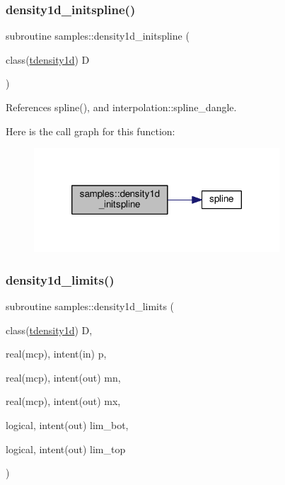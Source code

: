 \mbox{\label{namespacesamples_a87a98c09efa7d17b3ff7d0db04d66b73}} 
\subsubsection{\texorpdfstring{density1d\+\_\+initspline()}{density1d\_initspline()}}
{\footnotesize\ttfamily subroutine samples\+::density1d\+\_\+initspline (\begin{DoxyParamCaption}\item[{class(\mbox{\hyperlink{structsamples_1_1tdensity1d}{tdensity1d}})}]{D }\end{DoxyParamCaption})}



References spline(), and interpolation\+::spline\+\_\+dangle.

Here is the call graph for this function\+:
\nopagebreak
\begin{figure}[H]
\begin{center}
\leavevmode
\includegraphics[width=260pt]{namespacesamples_a87a98c09efa7d17b3ff7d0db04d66b73_cgraph}
\end{center}
\end{figure}
\mbox{\label{namespacesamples_a65a3ed5d18fe56c9dbc21e5787d86047}} 
\subsubsection{\texorpdfstring{density1d\+\_\+limits()}{density1d\_limits()}}
{\footnotesize\ttfamily subroutine samples\+::density1d\+\_\+limits (\begin{DoxyParamCaption}\item[{class(\mbox{\hyperlink{structsamples_1_1tdensity1d}{tdensity1d}})}]{D,  }\item[{real(mcp), intent(in)}]{p,  }\item[{real(mcp), intent(out)}]{mn,  }\item[{real(mcp), intent(out)}]{mx,  }\item[{logical, intent(out)}]{lim\+\_\+bot,  }\item[{logical, intent(out)}]{lim\+\_\+top }\end{DoxyParamCaption})}

